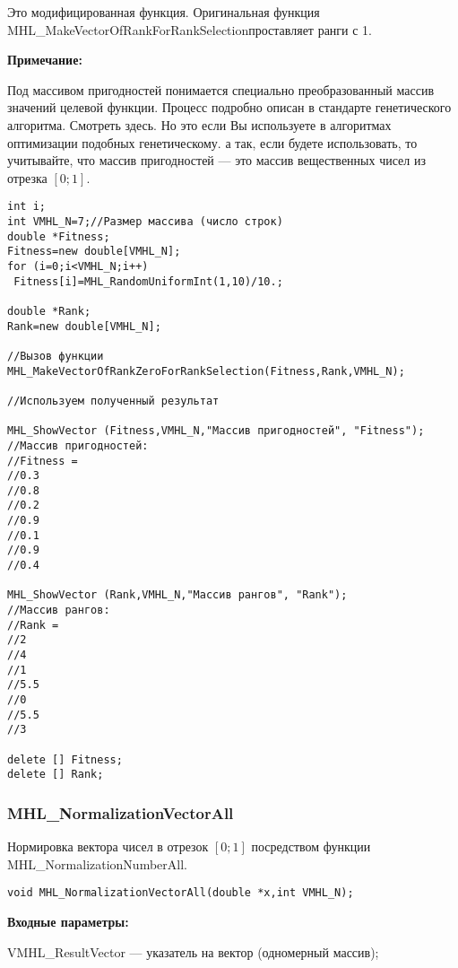 \documentclass[a4paper,12pt]{article}
\begin{document}
Это модифицированная функция. Оригинальная функция MHL\_MakeVectorOfRankForRankSelectionпроставляет ранги с 1.

\textbf{Примечание:}

 Под массивом пригодностей понимается специально преобразованный массив значений целевой функции. Процесс подробно описан в стандарте генетического алгоритма. Смотреть здесь. Но это если Вы используете в алгоритмах оптимизации подобных генетическому. а так, если будете использовать, то учитывайте, что массив пригодностей --- это массив вещественных чисел из отрезка $[0;1]$.



\begin{lstlisting}[label=code_use_MHL_MakeVectorOfRankZeroForRankSelection,caption=Пример использования]
int i;
int VMHL_N=7;//Размер массива (число строк)
double *Fitness;
Fitness=new double[VMHL_N];
for (i=0;i<VMHL_N;i++)
 Fitness[i]=MHL_RandomUniformInt(1,10)/10.;

double *Rank;
Rank=new double[VMHL_N];

//Вызов функции
MHL_MakeVectorOfRankZeroForRankSelection(Fitness,Rank,VMHL_N);

//Используем полученный результат

MHL_ShowVector (Fitness,VMHL_N,"Массив пригодностей", "Fitness");
//Массив пригодностей:
//Fitness =
//0.3
//0.8
//0.2
//0.9
//0.1
//0.9
//0.4

MHL_ShowVector (Rank,VMHL_N,"Массив рангов", "Rank");
//Массив рангов:
//Rank =
//2
//4
//1
//5.5
//0
//5.5
//3

delete [] Fitness;
delete [] Rank;
\end{lstlisting}

\subsubsection{MHL\_NormalizationVectorAll}\label{MHL_NormalizationVectorAll}

Нормировка вектора чисел в отрезок $[0;1]$ посредством функции MHL\_NormalizationNumberAll.


\begin{lstlisting}[label=code_syntax_MHL_NormalizationVectorAll,caption=Синтаксис]
void MHL_NormalizationVectorAll(double *x,int VMHL_N);
\end{lstlisting}

\textbf{Входные параметры:}

 VMHL\_ResultVector --- указатель на вектор (одномерный массив);
 
\end{document}

